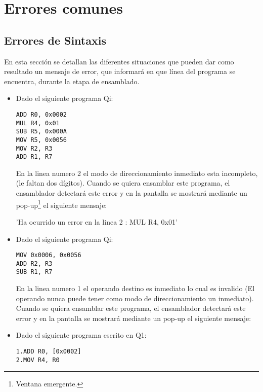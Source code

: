 \section{Errores comunes}

\subsection{Errores de Sintaxis} 

En esta sección se detallan las diferentes situaciones que pueden dar como resultado un mensaje de error, que informará en que línea del programa se encuentra, durante la etapa de ensamblado.

\begin{itemize}

\item Dado el siguiente programa Qi:

\begin{verbatim}
ADD R0, 0x0002
MUL R4, 0x01
SUB R5, 0x000A
MOV R5, 0x0056
MOV R2, R3
ADD R1, R7
\end{verbatim}

En la linea numero 2 el modo de direccionamiento inmediato esta incompleto, (le faltan dos dígitos). Cuando se quiera ensamblar este programa, el ensamblador detectará este error y en la pantalla se mostrará mediante un pop-up\footnote{Ventana emergente.} el siguiente mensaje:
 
'Ha ocurrido un error en la linea 2 : MUL R4, 0x01' \\  

\item Dado el siguiente programa Qi:

\begin{verbatim}
MOV 0x0006, 0x0056
ADD R2, R3
SUB R1, R7
\end{verbatim}

En la linea numero 1 el operando destino es inmediato lo cual es invalido (El operando nunca puede tener como modo de direccionamiento un inmediato). Cuando se quiera ensamblar este programa, el ensamblador detectará este error y en la pantalla se mostrará mediante un pop-up el siguiente mensaje:


\item Dado el siguiente programa escrito en Q1:

\begin{verbatim}
1.ADD R0, [0x0002]
2.MOV R4, R0
\end{verbatim}


\end{itemize}

